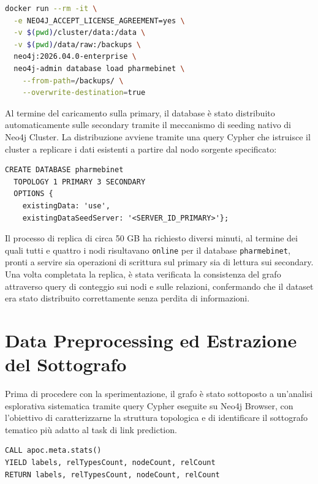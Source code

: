 \begin{lstlisting}[language=bash, caption={Caricamento del dump PharMeBiNet V3}]
docker run --rm -it \
  -e NEO4J_ACCEPT_LICENSE_AGREEMENT=yes \
  -v $(pwd)/cluster/data:/data \
  -v $(pwd)/data/raw:/backups \
  neo4j:2026.04.0-enterprise \
  neo4j-admin database load pharmebinet \
    --from-path=/backups/ \
    --overwrite-destination=true
\end{lstlisting}

Al termine del caricamento sulla primary, il database è stato distribuito automaticamente sulle secondary tramite il meccanismo di seeding nativo di Neo4j Cluster. La distribuzione avviene tramite una query Cypher che istruisce il cluster a replicare i dati esistenti a partire dal nodo sorgente specificato:

\begin{lstlisting}[language=Cypher, caption={Creazione del database distribuito con seeding}]
CREATE DATABASE pharmebinet
  TOPOLOGY 1 PRIMARY 3 SECONDARY
  OPTIONS {
    existingData: 'use',
    existingDataSeedServer: '<SERVER_ID_PRIMARY>'};
\end{lstlisting}

Il processo di replica di circa 50 GB ha richiesto diversi minuti, al termine dei quali tutti e quattro i nodi risultavano \texttt{online} per il database \texttt{pharmebinet}, pronti a servire sia operazioni di scrittura sul primary sia di lettura sui secondary. Una volta completata la replica, è stata verificata la consistenza del grafo attraverso query di conteggio sui nodi e sulle relazioni, confermando che il dataset era stato distribuito correttamente senza perdita di informazioni.

\section{Data Preprocessing ed Estrazione del Sottografo}

Prima di procedere con la sperimentazione, il grafo è stato sottoposto a un'analisi esplorativa sistematica tramite query Cypher eseguite su Neo4j Browser, con l'obiettivo di caratterizzarne la struttura topologica e di identificare il sottografo tematico più adatto al task di link prediction.

\begin{lstlisting}[language=Cypher, caption={Query EDA su PharMeBiNet}]
CALL apoc.meta.stats()
YIELD labels, relTypesCount, nodeCount, relCount
RETURN labels, relTypesCount, nodeCount, relCount
\end{lstlisting}

